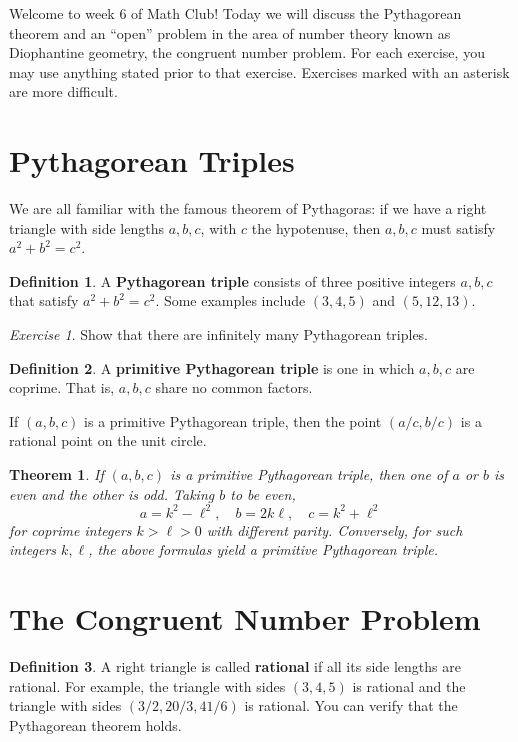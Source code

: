 \documentclass{article}
\newtheorem{theorem}{Theorem}%
\theoremstyle{definition}
\newtheorem{definition}{Definition}%
\theoremstyle{remark}
\newtheorem{exercise}{Exercise}
\begin{document}
Welcome to week 6 of Math Club!
Today we will discuss the Pythagorean theorem and an ``open'' problem in the area of number theory known as Diophantine geometry, the congruent number problem.
For each exercise, you may use anything stated prior to that exercise.
Exercises marked with an asterisk are more difficult.

\section{Pythagorean Triples}

We are all familiar with the famous theorem of Pythagoras: if we have a right triangle with side lengths \(a,b,c\), with \(c\) the hypotenuse, then \(a,b,c\) must satisfy \(a^2+b^2=c^2\).

\begin{definition}
	A \textbf{Pythagorean triple} consists of three positive integers \(a,b,c\) that satisfy \(a^2+b^2=c^2\).
	Some examples include \((3,4,5)\) and \((5,12,13)\).
\end{definition}

\begin{exercise}
	Show that there are infinitely many Pythagorean triples.
\end{exercise}

\begin{definition}
	A \textbf{primitive Pythagorean triple} is one in which \(a,b,c\) are coprime.
	That is, \(a,b,c\) share no common factors.
\end{definition}

If \((a,b,c)\) is a primitive Pythagorean triple, then the point \((a/c,b/c)\) is a rational point on the unit circle.

\begin{theorem}
	If \((a,b,c)\) is a primitive Pythagorean triple, then one of \(a\) or \(b\) is even and the other is odd.
	Taking \(b\) to be even, 
	\[a=k^2-\ell^2,\quad b=2k\ell,\quad c=k^2+\ell^2\]
	for coprime integers \(k>\ell>0\) with different parity.
	Conversely, for such integers \(k,\ell\), the above formulas yield a primitive Pythagorean triple.
\end{theorem}

\section{The Congruent Number Problem}

\begin{definition}
    A right triangle is called \textbf{rational} if all its side lengths are rational.
    For example, the triangle with sides \((3,4,5)\) is rational and the triangle with sides \((3/2,20/3,41/6)\) is rational.
    You can verify that the Pythagorean theorem holds.
\end{definition}
\end{document}
